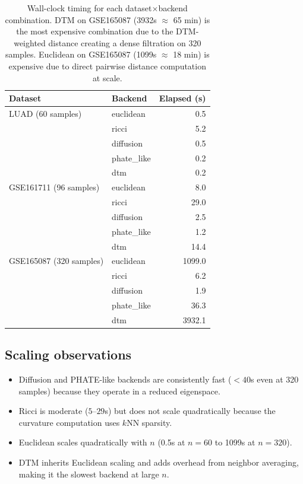 \documentclass[11pt]{article}
\begin{document}
\begin{table}[h]
\centering
\small
\begin{tabular}{llr}
\toprule
Dataset & Backend & Elapsed (s) \\
\midrule
LUAD (60 samples) & euclidean & 0.5 \\
 & ricci & 5.2 \\
 & diffusion & 0.5 \\
 & phate\_like & 0.2 \\
 & dtm & 0.2 \\
\midrule
GSE161711 (96 samples) & euclidean & 8.0 \\
 & ricci & 29.0 \\
 & diffusion & 2.5 \\
 & phate\_like & 1.2 \\
 & dtm & 14.4 \\
\midrule
GSE165087 (320 samples) & euclidean & 1099.0 \\
 & ricci & 6.2 \\
 & diffusion & 1.9 \\
 & phate\_like & 36.3 \\
 & dtm & 3932.1 \\
\bottomrule
\end{tabular}
\caption{Wall-clock timing for each dataset$\times$backend combination.
DTM on GSE165087 (3932s $\approx$ 65 min) is the most expensive combination due to the DTM-weighted distance creating a dense filtration on 320 samples.
Euclidean on GSE165087 (1099s $\approx$ 18 min) is expensive due to direct pairwise distance computation at scale.}
\label{tab:timing_full}
\end{table}

\subsection{Scaling observations}
\begin{itemize}[leftmargin=1.5em]
\item Diffusion and PHATE-like backends are consistently fast ($< 40$s even at 320 samples) because they operate in a reduced eigenspace.
\item Ricci is moderate ($5$--$29$s) but does not scale quadratically because the curvature computation uses $k$NN sparsity.
\item Euclidean scales quadratically with $n$ (0.5s at $n=60$ to 1099s at $n=320$).
\item DTM inherits Euclidean scaling and adds overhead from neighbor averaging, making it the slowest backend at large $n$.
\end{itemize}
\end{document}
